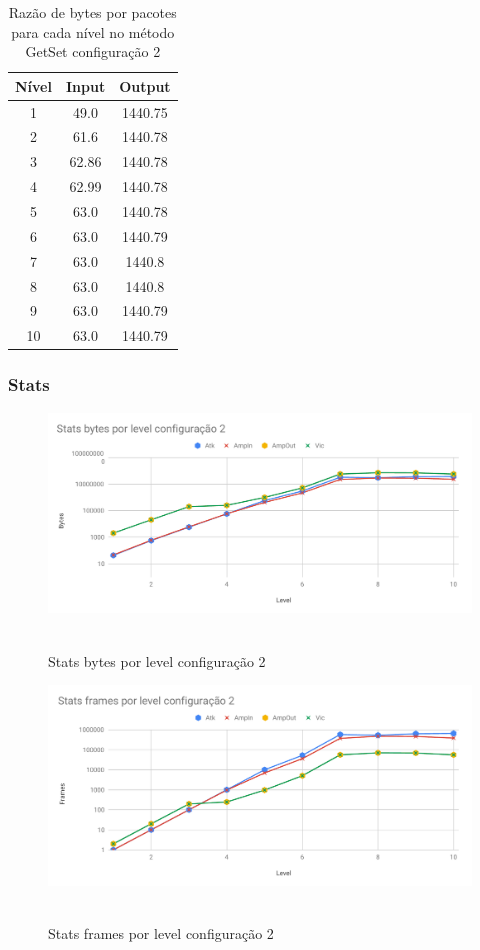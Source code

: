 \begin{table}[H]
\centering
\label{tab:bytespacsGetSet2}
\caption{Razão de bytes por pacotes para cada nível no método GetSet configuração 2}
\begin{tabular}{|c|c|c|}
\hline
Nível & Input & Output  \\ \hline
1     & 49.0  & 1440.75 \\ \hline
2     & 61.6  & 1440.78 \\ \hline
3     & 62.86 & 1440.78 \\ \hline
4     & 62.99 & 1440.78 \\ \hline
5     & 63.0  & 1440.78 \\ \hline
6     & 63.0  & 1440.79 \\ \hline
7     & 63.0  & 1440.8  \\ \hline
8     & 63.0  & 1440.8  \\ \hline
9     & 63.0  & 1440.79 \\ \hline
10    & 63.0  & 1440.79 \\ \hline
\end{tabular}
\end{table}

\subsubsection{Stats}

\begin{figure}[H]
     \centering
     \label{graf:StatsBytes2}
     \includegraphics[scale=0.6]{img/capturas/StatsBLC2.pdf}\
     \caption{Stats bytes por level configuração 2}
\end{figure}

\begin{figure}[H]
     \centering
     \label{graf:StatsFrames2}
     \includegraphics[scale=0.6]{img/capturas/StatsFLC2.pdf}\
     \caption{Stats frames por level configuração 2}
\end{figure}

